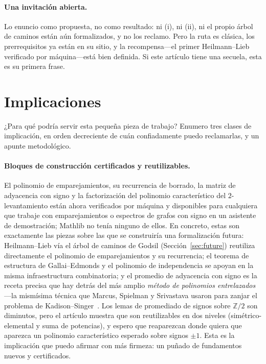 \documentclass[11pt]{article}
\newcommand{\Z}{\mathbb{Z}}
\begin{document}
\paragraph{Una invitación abierta.}
Lo enuncio como propuesta, no como resultado: ni (i), ni (ii), ni el propio árbol
de caminos están aún formalizados, y no los reclamo. Pero la ruta es clásica, los
prerrequisitos ya están en su sitio, y la recompensa---el primer Heilmann--Lieb
verificado por máquina---está bien definida. Si este artículo tiene una secuela,
esta es su primera frase.

\section{Implicaciones}
\label{sec:implications}

¿Para qué podría servir esta pequeña pieza de trabajo? Enumero tres clases de
implicación, en orden decreciente de cuán confiadamente puedo reclamarlas, y un
apunte metodológico.

\paragraph{Bloques de construcción certificados y reutilizables.}
El polinomio de emparejamientos, su recurrencia de borrado, la matriz de
adyacencia con signo y la factorización del polinomio característico del
$2$-levantamiento están ahora verificados por máquina y disponibles para
cualquiera que trabaje con emparejamientos o espectros de grafos con signo en un
asistente de demostración; Mathlib no tenía ninguno de ellos. En concreto, estas
son exactamente las piezas sobre las que se construiría una formalización futura:
Heilmann--Lieb vía el árbol de caminos de Godsil (Sección~\ref{sec:future})
reutiliza directamente el polinomio de emparejamientos y su recurrencia; el
teorema de estructura de Gallai--Edmonds y el polinomio de independencia se apoyan
en la misma infraestructura combinatoria; y el promedio de adyacencia con signo es
la receta precisa que hay detrás del más amplio \emph{método de polinomios
entrelazados}---la mismísima técnica que Marcus, Spielman y Srivastava usaron para
zanjar el problema de Kadison--Singer~\cite{MSS2015b}. Los lemas de promediado de
signos sobre $\Z/2$ son diminutos, pero el artículo muestra que son reutilizables
en dos niveles (simétrico-elemental y suma de potencias), y espero que reaparezcan
donde quiera que aparezca un polinomio característico esperado sobre signos
$\pm1$. Esta es la implicación que puedo afirmar con más firmeza: un puñado de
fundamentos nuevos y certificados.
\end{document}
